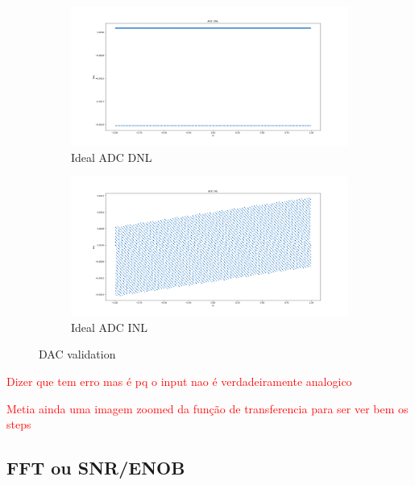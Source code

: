 \begin{figure}[h]
    \begin{subfigure}[b]{0.5\textwidth}
        \centering
        \includegraphics[width=\textwidth]{Images/DNL_Ideal.png}
        \caption{Ideal ADC DNL}
        \label{fig:ADC_DNL_Ideal}
    \end{subfigure}%
    \begin{subfigure}[b]{0.5\textwidth}
        \centering
        \includegraphics[width=\textwidth]{Images/INL_Ideal.png}
        \caption{Ideal ADC INL}
        \label{fig:ADC_INL_Ideal}
    \end{subfigure}

    \caption{DAC validation}
    \label{fig:IdealADC}
\end{figure}

\textcolor{red}{Dizer que tem erro mas é pq o input nao é verdadeiramente analogico}

\textcolor{red}{Metia ainda uma imagem zoomed da função de transferencia para ser ver bem os steps}



\subsection{FFT ou SNR/ENOB}

